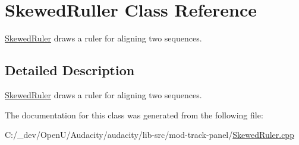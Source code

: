 \hypertarget{class_skewed_ruller}{}\section{Skewed\+Ruller Class Reference}
\label{class_skewed_ruller}


\hyperlink{class_skewed_ruler}{Skewed\+Ruler} draws a ruler for aligning two sequences.  




\subsection{Detailed Description}
\hyperlink{class_skewed_ruler}{Skewed\+Ruler} draws a ruler for aligning two sequences. 

The documentation for this class was generated from the following file\+:\begin{DoxyCompactItemize}
\item 
C\+:/\+\_\+dev/\+Open\+U/\+Audacity/audacity/lib-\/src/mod-\/track-\/panel/\hyperlink{_skewed_ruler_8cpp}{Skewed\+Ruler.\+cpp}\end{DoxyCompactItemize}

